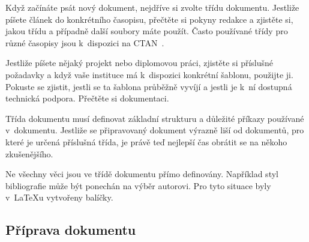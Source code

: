 \documentclass[oldcsbabel]{csbulletin}
\begin{document}
Když začínáte psát nový dokument, nejdříve si zvolte třídu dokumentu. Jestliže píšete článek do konkrétního časopisu, přečtěte si pokyny redakce a zjistěte si, jakou třídu a případně další soubory máte použít. Často používané třídy pro různé časopisy jsou k~dispozici na CTAN~\cite{ctansearch}.

Jestliže píšete nějaký projekt nebo diplomovou práci, zjistěte si příslušné požadavky a když vaše instituce má k~dispozici konkrétní šablonu, použijte ji. Pokuste se zjistit, jestli se ta šablona průběžně vyvíjí a jestli je k~ní dostupná technická podpora. Přečtěte si dokumentaci.

Třída dokumentu musí definovat základní strukturu a důležité příkazy používané v~dokumentu. Jestliže se připravovaný dokument výrazně liší od dokumentů, pro které je určená příslušná třída, je právě teď nejlepší čas obrátit se na někoho zkušenějšího.

Ne všechny věci jsou ve třídě dokumentu přímo definovány. Například styl bibliografie může být ponechán na výběr autorovi. Pro tyto situace byly v~\LaTeX u vytvořeny balíčky.

\subsection{Příprava dokumentu}
\end{document}
